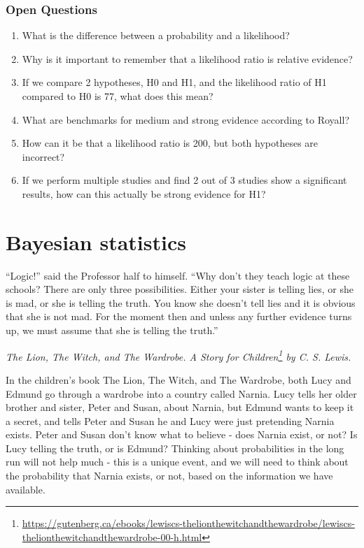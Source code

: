 \documentclass[
  oneside]{krantz}
\renewenvironment{quote}{\begin{VF}}{\end{VF}}
\renewcommand{\href}[2]{#2\footnote{\url{#1}}}
\begin{document}
\hypertarget{open-questions-2}{%
\subsection{Open Questions}\label{open-questions-2}}

\begin{enumerate}
\def\labelenumi{\arabic{enumi}.}
\item
  What is the difference between a probability and a likelihood?
\item
  Why is it important to remember that a likelihood ratio is relative evidence?
\item
  If we compare 2 hypotheses, H0 and H1, and the likelihood ratio of H1 compared to H0 is 77, what does this mean?
\item
  What are benchmarks for medium and strong evidence according to Royall?
\item
  How can it be that a likelihood ratio is 200, but both hypotheses are incorrect?
\item
  If we perform multiple studies and find 2 out of 3 studies show a significant results, how can this actually be strong evidence for H1?
\end{enumerate}

\hypertarget{bayes}{%
\chapter{Bayesian statistics}\label{bayes}}

\begin{quote}
``Logic!'' said the Professor half to himself. ``Why don't they teach logic at these schools? There are only three possibilities. Either your sister is telling lies, or she is mad, or she is telling the truth. You know she doesn't tell lies and it is obvious that she is not mad. For the moment then and unless any further evidence turns up, we must assume that she is telling the truth.''
\end{quote}

\emph{\href{https://gutenberg.ca/ebooks/lewiscs-thelionthewitchandthewardrobe/lewiscs-thelionthewitchandthewardrobe-00-h.html}{The Lion, The Witch, and The Wardrobe. A Story for Children} by C. S. Lewis.}

In the children's book The Lion, The Witch, and The Wardrobe, both Lucy and Edmund go through a wardrobe into a country called Narnia. Lucy tells her older brother and sister, Peter and Susan, about Narnia, but Edmund wants to keep it a secret, and tells Peter and Susan he and Lucy were just pretending Narnia exists. Peter and Susan don't know what to believe - does Narnia exist, or not? Is Lucy telling the truth, or is Edmund? Thinking about probabilities in the long run will not help much - this is a unique event, and we will need to think about the probability that Narnia exists, or not, based on the information we have available.
\end{document}
